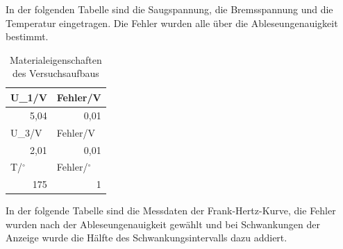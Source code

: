 \documentclass[12pt,a4paper]{article}
\begin{document}
In der folgenden Tabelle sind die Saugspannung, die Bremsspannung und die Temperatur eingetragen. Die Fehler wurden alle über die Ableseungenauigkeit bestimmt.

\begin{table}[H]
\caption{Materialeigenschaften des Versuchsaufbaus}
\begin{center}
\begin{tabular}{|l|l|}
\hline
U\_1/V & Fehler/V \\ \hline
\multicolumn{1}{|r|}{5,04} & \multicolumn{1}{r|}{0,01} \\ \hline
U\_3/V & Fehler/V \\ \hline
\multicolumn{1}{|r|}{2,01} & \multicolumn{1}{r|}{0,01} \\ \hline
T/$^\circ$ & Fehler/$^\circ$ \\ \hline
\multicolumn{1}{|r|}{175} & \multicolumn{1}{r|}{1} \\ \hline
\end{tabular}
\end{center}
\label{tab:eingenschaften}
\end{table}

In der folgende Tabelle sind die Messdaten der Frank-Hertz-Kurve, die Fehler wurden nach der Ableseungenauigkeit gewählt und bei Schwankungen der Anzeige wurde die Hälfte des Schwankungsintervalls dazu addiert.
\end{document}
